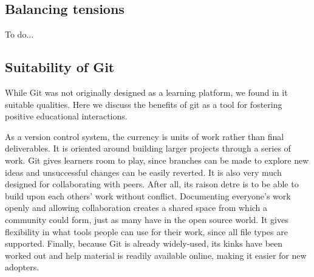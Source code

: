 \documentclass[12pt,twoside,vi]{mitthesis}
\newcommand{\wip}[1]{{\color{red} To do...}}
\begin{document}
\subsection{Balancing tensions}

\wip{We also aimed to foster a community that would extend into the later phases of the Accelerator. 

Finally, we rely on good software development practices and use popular tools where possible.

Communication. Communication lays the groundwork for the type of community formed. We aim to have instructors clearly communicate how to use the platform and be able to guide students throughout the course. We would like to allow natural and structured opportunities to ask questions and give feedback. General course information should be readily accessible to students.

Permissions. We will have to decide how to control authority to perform actions and visibility of content. On one hand, we believe that the platform should be as open as possible. This would allow students the opportunity to pursue their curiosities, to learn from each other's work, and to feel that they have a complete understanding of the platform. On the other hand, we would like to prevent either intentional or accidental actions that may destroy or hinder other participants' work. We also anticipate that sensitive topics would not be expressed without a private way of doing so and thus would like to allow for that.}

\subsection{Suitability of Git}

While Git was not originally designed as a learning platform, we found in it suitable qualities. Here we discuss the benefits of git as a tool for fostering positive educational interactions.

As a version control system, the currency is units of work rather than final deliverables. It is oriented around building larger projects through a series of work. Git gives learners room to play, since branches can be made to explore new ideas and unsuccessful changes can be easily reverted. It is also very much designed for collaborating with peers. After all, its raison detre is to be able to build upon each others' work without conflict. Documenting everyone's work openly and allowing collaboration creates a shared space from which a community could form, just as many have in the open source world. It gives flexibility in what tools people can use for their work, since all file types are supported. Finally, because Git is already widely-used, its kinks have been worked out and help material is readily available online, making it easier for new adopters.
\end{document}
